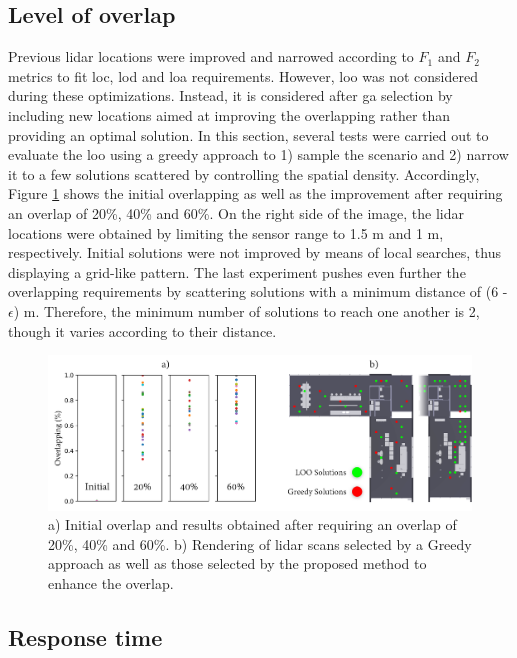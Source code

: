 \subsection{Level of overlap}

Previous \acrshort{lidar} locations were improved and narrowed according to $F_1$ and $F_2$ metrics to fit \acrshort{loc}, \acrshort{lod} and \acrshort{loa} requirements. However, \acrshort{loo} was not considered during these optimizations. Instead, it is considered after \acrshort{ga} selection by including new locations aimed at improving the overlapping rather than providing an optimal solution. In this section, several tests were carried out to evaluate the \acrshort{loo} using a greedy approach to 1) sample the scenario and 2) narrow it to a few solutions scattered by controlling the spatial density. Accordingly, Figure \ref{fig:loo_results} shows the initial overlapping as well as the improvement after requiring an overlap of 20\%, 40\% and 60\%. On the right side of the image, the \acrshort{lidar} locations were obtained by limiting the sensor range to 1.5 \si{\meter} and 1 \si{\meter}, respectively. Initial solutions were not improved by means of local searches, thus displaying a grid-like pattern. The last experiment pushes even further the overlapping requirements by scattering solutions with a minimum distance of (6 - $\epsilon$) \si{\meter}. Therefore, the minimum number of solutions to reach one another is 2, though it varies according to their distance. 

\begin{figure}
    \centering
    \includegraphics[width=\linewidth]{figs/lidar_optimization/loo_results.png}
	\caption{a) Initial overlap and results obtained after requiring an overlap of 20\%, 40\% and 60\%. b) Rendering of \acrshort{lidar} scans selected by a Greedy approach as well as those selected by the proposed method to enhance the overlap. }
	\label{fig:loo_results}
\end{figure}

\subsection{Response time}

